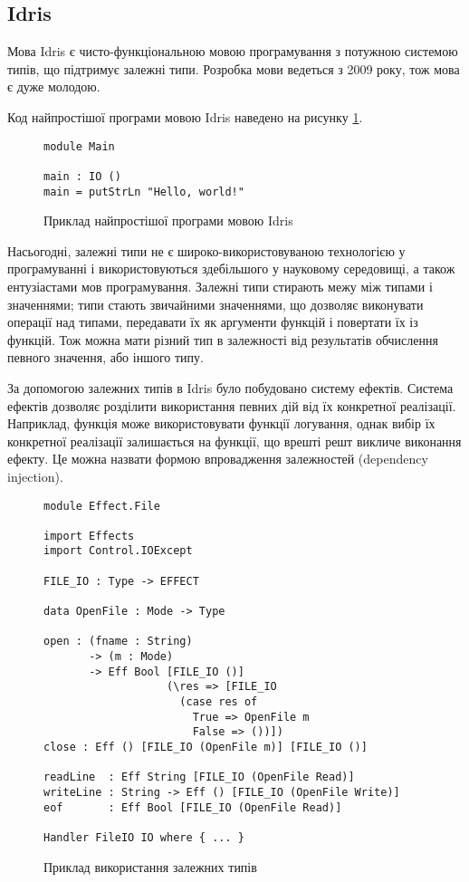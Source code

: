 \documentclass[main.tex]{subfiles}
\begin{document}
\subsection{Idris}\label{sec:idris}

Мова Idris\cite{idris} є чисто-функціональною мовою програмування з потужною системою типів, що підтримує залежні типи. Розробка мови ведеться з 2009 року\cite{idris:first-release}, тож мова є дуже молодою.

Код найпростішої програми мовою Idris наведено на рисунку \ref{example:idris}.

\begin{figure}[h]
  \centering
  \begin{verbatim}
module Main

main : IO ()
main = putStrLn "Hello, world!"
  \end{verbatim}
  \caption{Приклад найпростішої програми мовою Idris}
  \label{example:idris}
\end{figure}

Насьогодні, залежні типи не є широко-використовуваною технологією у програмуванні і використовуються здебільшого у науковому середовищі, а також ентузіастами мов програмування. Залежні типи стирають межу між типами і значеннями; типи стають звичайними значеннями, що дозволяє виконувати операції над типами, передавати їх як аргументи функцій і повертати їх із функцій. Тож можна мати різний тип в залежності від результатів обчислення певного значення, або іншого типу.

За допомогою залежних типів в Idris було побудовано систему ефектів. Система ефектів дозволяє розділити використання певних дій від їх конкретної реалізації. Наприклад, функція може використовувати функції логування, однак вибір їх конкретної реалізації залишається на функції, що врешті решт викличе виконання ефекту. Це можна назвати формою впровадження залежностей (dependency injection).

\begin{figure}%
  \centering
  \begin{verbatim}
module Effect.File

import Effects
import Control.IOExcept

FILE_IO : Type -> EFFECT

data OpenFile : Mode -> Type

open : (fname : String)
       -> (m : Mode)
       -> Eff Bool [FILE_IO ()]
                   (\res => [FILE_IO
                     (case res of
                       True => OpenFile m
                       False => ())])
close : Eff () [FILE_IO (OpenFile m)] [FILE_IO ()]

readLine  : Eff String [FILE_IO (OpenFile Read)]
writeLine : String -> Eff () [FILE_IO (OpenFile Write)]
eof       : Eff Bool [FILE_IO (OpenFile Read)]

Handler FileIO IO where { ... }
  \end{verbatim}
  \caption{Приклад використання залежних типів}
  \label{idris:dependent-types}
\end{figure}
\end{document}
